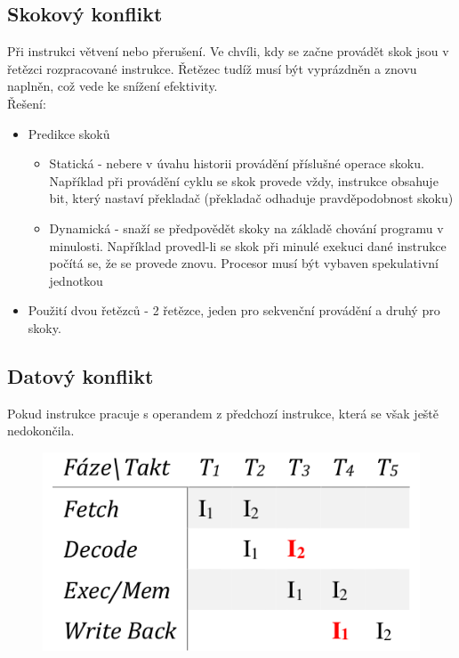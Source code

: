 \subsection{Skokový konflikt}
Při instrukci větvení nebo přerušení. Ve chvíli, kdy se začne provádět skok jsou v řetězci rozpracované instrukce. Řetězec tudíž musí být vyprázdněn a znovu naplněn, což vede ke snížení efektivity.\\
Řešení:
\begin{itemize}
    \item Predikce skoků
          \begin{itemize}
              \item Statická - nebere v úvahu historii provádění příslušné operace skoku. Například při provádění cyklu se skok provede vždy, instrukce obsahuje bit, který nastaví překladač (překladač odhaduje pravděpodobnost skoku)
              \item Dynamická - snaží se předpovědět skoky na základě chování programu v minulosti. Například provedl-li se skok při minulé exekuci dané instrukce počítá se, že se provede znovu. Procesor musí být vybaven spekulativní jednotkou
          \end{itemize}
    \item Použití dvou řetězců - 2 řetězce, jeden pro sekvenční provádění a druhý pro skoky.
\end{itemize}

\subsection{Datový konflikt}
Pokud instrukce pracuje s operandem z předchozí instrukce, která se však ještě nedokončila. \\

\begin{figure}[h!]
    \centering
    \includegraphics[scale = 0.4]{img/datKonf.png}
\end{figure}

